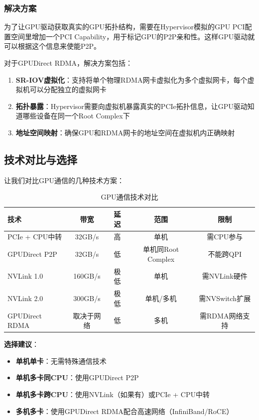 \subsubsection{解决方案}

为了让GPU驱动获取真实的GPU拓扑结构，需要在Hypervisor模拟的GPU PCI配置空间里增加一个PCI Capability，用于标记GPU的P2P亲和性。这样GPU驱动就可以根据这个信息来使能P2P。

对于GPUDirect RDMA，解决方案包括：
\begin{enumerate}
    \item \textbf{SR-IOV虚拟化}：支持将单个物理RDMA网卡虚拟化为多个虚拟网卡，每个虚拟机可以分配独立的虚拟网卡
    \item \textbf{拓扑暴露}：Hypervisor需要向虚拟机暴露真实的PCIe拓扑信息，让GPU驱动知道哪些设备在同一个Root Complex下
    \item \textbf{地址空间映射}：确保GPU和RDMA网卡的地址空间在虚拟机内正确映射
\end{enumerate}

\subsection{技术对比与选择}

让我们对比GPU通信的几种技术方案：

\begin{table}[h]
\centering
\caption{GPU通信技术对比}
\begin{tabular}{|l|c|c|c|c|}
\hline
\textbf{技术} & \textbf{带宽} & \textbf{延迟} & \textbf{范围} & \textbf{限制} \\
\hline
PCIe + CPU中转 & 32GB/s & 高 & 单机 & 需CPU参与 \\
\hline
GPUDirect P2P & 32GB/s & 低 & 单机同Root Complex & 不能跨QPI \\
\hline
NVLink 1.0 & 160GB/s & 极低 & 单机 & 需NVLink硬件 \\
\hline
NVLink 2.0 & 300GB/s & 极低 & 单机/多机 & 需NVSwitch扩展 \\
\hline
GPUDirect RDMA & 取决于网络 & 低 & 多机 & 需RDMA网络支持 \\
\hline
\end{tabular}
\end{table}

\textbf{选择建议}：
\begin{itemize}
    \item \textbf{单机单卡}：无需特殊通信技术
    \item \textbf{单机多卡同CPU}：使用GPUDirect P2P
    \item \textbf{单机多卡跨CPU}：使用NVLink（如果有）或PCIe + CPU中转
    \item \textbf{多机多卡}：使用GPUDirect RDMA配合高速网络（InfiniBand/RoCE）
\end{itemize}

